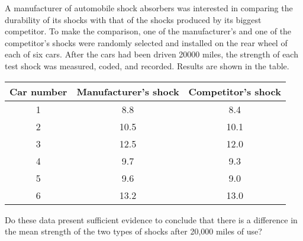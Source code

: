 
\begin{exercise}

    A manufacturer of automobile shock absorbers was interested in comparing the durability of
    its shocks with that of the shocks produced by its biggest competitor. To make the comparison,
    one of the manufacturer’s and one of the competitor’s shocks were randomly selected
    and installed on the rear wheel of each of six cars. After the cars had been driven 20000
    miles, the strength of each test shock was measured, coded, and recorded. Results are shown
    in the table.

    \begin{center}
        \begin{tabular}{c | c c } 
        \textbf{Car number} & \textbf{Manufacturer's shock} & \textbf{Competitor's shock} \\  
        \hline
        1 & 8.8 & 8.4 \\
        2 & 10.5 & 10.1 \\
        3 & 12.5 & 12.0 \\
        4 & 9.7 & 9.3 \\
        5 & 9.6 & 9.0 \\
        6 & 13.2 & 13.0 \\
        \hline
       \end{tabular}
       
    \end{center}

    Do these data present sufficient evidence to conclude that there is 
    a difference in the mean strength of the two types of shocks after
    20,000 miles of use?

\end{exercise}


\begin{solution}

\phantom{}

\end{solution}

